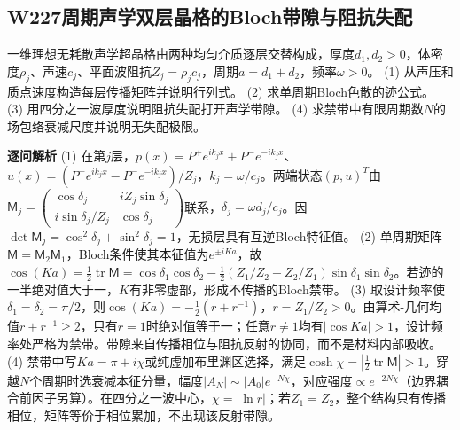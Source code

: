 \subsection*{W227\quad 周期声学双层晶格的Bloch带隙与阻抗失配}
一维理想无耗散声学超晶格由两种均匀介质逐层交替构成，厚度$d_1,d_2>0$，体密度$\rho_j$、声速$c_j$、平面波阻抗$Z_j=\rho_jc_j$，周期$a=d_1+d_2$，频率$\omega>0$。
(1) 从声压和质点速度构造每层传播矩阵并说明行列式。
(2) 求单周期Bloch色散的迹公式。
(3) 用四分之一波厚度说明阻抗失配打开声学带隙。
(4) 求禁带中有限周期数$N$的场包络衰减尺度并说明无失配极限。
\par\textbf{逐问解析}
(1) 在第$j$层，$p(x)=P^+e^{ik_jx}+P^-e^{-ik_jx}$、$u(x)=(P^+e^{ik_jx}-P^-e^{-ik_jx})/Z_j$，$k_j=\omega/c_j$。两端状态$(p,u)^T$由$\mathsf M_j=\begin{pmatrix}\cos\delta_j&iZ_j\sin\delta_j\\i\sin\delta_j/Z_j&\cos\delta_j\end{pmatrix}$联系，$\delta_j=\omega d_j/c_j$。因$\det\mathsf M_j=\cos^2\delta_j+\sin^2\delta_j=1$，无损层具有互逆Bloch特征值。
(2) 单周期矩阵$\mathsf M=\mathsf M_2\mathsf M_1$，Bloch条件使其本征值为$e^{\pm iKa}$，故$\cos(Ka)=\tfrac12\operatorname{tr}\mathsf M=\cos\delta_1\cos\delta_2-\tfrac12(Z_1/Z_2+Z_2/Z_1)\sin\delta_1\sin\delta_2$。若迹的一半绝对值大于一，$K$有非零虚部，形成不传播的Bloch禁带。
(3) 取设计频率使$\delta_1=\delta_2=\pi/2$，则$\cos(Ka)=-\tfrac12(r+r^{-1})$，$r=Z_1/Z_2>0$。由算术-几何均值$r+r^{-1}\ge2$，只有$r=1$时绝对值等于一；任意$r\ne1$均有$|\cos Ka|>1$，设计频率处严格为禁带。带隙来自传播相位与阻抗反射的协同，而不是材料内部吸收。
(4) 禁带中写$Ka=\pi+i\chi$或纯虚加布里渊区选择，满足$\cosh\chi=|\tfrac12\operatorname{tr}\mathsf M|>1$。穿越$N$个周期时选衰减本征分量，幅度$|A_N|\sim |A_0|e^{-N\chi}$，对应强度$\propto e^{-2N\chi}$（边界耦合前因子另算）。在四分之一波中心，$\chi=|\ln r|$；若$Z_1=Z_2$，整个结构只有传播相位，矩阵等价于相位累加，不出现该反射带隙。
\par\medskip
